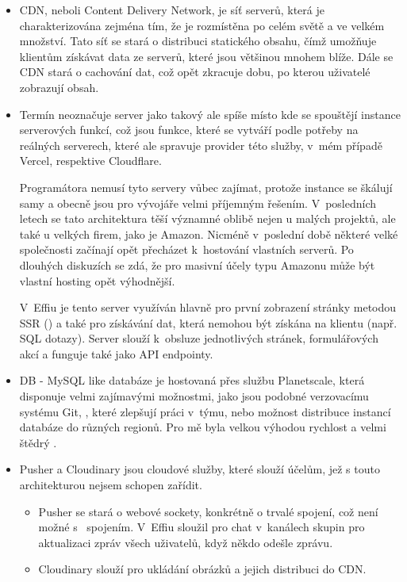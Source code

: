 \documentclass[12pt, a4paper,
openright
]{report}
\begin{document}
	\begin{itemize}
		\item CDN, neboli Content Delivery Network, je síť serverů, která je charakterizována zejména tím, že je rozmístěna po celém světě a ve velkém množství. Tato síť se stará o distribuci statického obsahu, čímž umožňuje klientům získávat data ze serverů, které jsou většinou mnohem blíže. Dále se CDN stará o cachování dat, což opět zkracuje dobu, po kterou uživatelé zobrazují obsah.
		\item Termín  neoznačuje server jako takový ale spíše místo kde se spouštějí instance serverových funkcí, což jsou funkce, které se vytváří podle potřeby na reálných serverech, které ale spravuje provider této služby, v~mém případě Vercel, respektive Cloudflare.
		
		Programátora nemusí tyto servery vůbec zajímat, protože instance se škálují samy a obecně jsou pro vývojáře velmi příjemným řešením. V~posledních letech se tato architektura těší významné oblibě nejen u malých projektů, ale také u velkých firem, jako je Amazon. Nicméně v~poslední době některé velké společnosti začínají opět přecházet k~hostování vlastních serverů. Po dlouhých diskuzích se zdá, že pro masivní účely typu Amazonu může být vlastní hosting opět výhodnější.
		
		V~Effiu je tento server využíván hlavně pro první zobrazení stránky metodou SSR () a také pro získávání dat, která nemohou být získána na klientu (např. SQL dotazy). Server slouží k~obsluze jednotlivých stránek, formulářových akcí a funguje také jako API endpointy.
		
		\item DB - MySQL like databáze je hostovaná přes službu Planetscale, která disponuje velmi zajímavými možnostmi, jako jsou  podobné verzovacímu systému Git, , které zlepšují práci v~týmu, nebo možnost distribuce  instancí databáze do různých regionů. Pro mě byla velkou výhodou rychlost a velmi štědrý .
		\item Pusher a Cloudinary jsou cloudové služby, které slouží účelům, jež s touto architekturou nejsem schopen zařídit.
		
		\begin{itemize}
			\item Pusher se stará o webové sockety, konkrétně o trvalé spojení, což není možné s~ spojením. V~Effiu sloužil pro chat v~kanálech skupin pro aktualizaci zpráv všech uživatelů, když někdo odešle zprávu.
			
			\item Cloudinary slouží pro ukládání obrázků a jejich distribuci do CDN.
		\end{itemize}
	\end{itemize}
\end{document}
